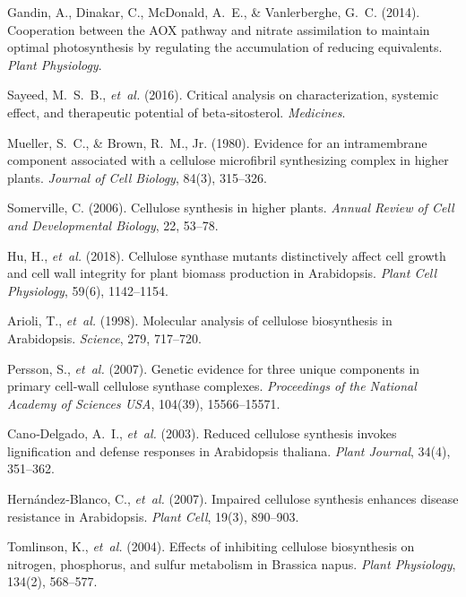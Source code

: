 \documentclass[10pt,letterpaper]{article}
\begin{document}
\begin{thebibliography}{10}
Gandin, A., Dinakar, C., McDonald, A.~E., \& Vanlerberghe, G.~C. (2014).
\newblock Cooperation between the AOX pathway and nitrate assimilation to maintain optimal photosynthesis by regulating the accumulation of reducing equivalents.
\newblock \emph{Plant Physiology}.
  
Sayeed, M.~S.~B., \emph{et~al.} (2016).  
Critical analysis on characterization, systemic effect, and therapeutic potential of beta‑sitosterol.  
\emph{Medicines}.

Mueller, S.~C., \& Brown, R.~M., Jr. (1980).  
Evidence for an intramembrane component associated with a cellulose microfibril synthesizing complex in higher plants.  
\emph{Journal of Cell Biology}, 84(3), 315–326.

Somerville, C. (2006).  
Cellulose synthesis in higher plants.  
\emph{Annual Review of Cell and Developmental Biology}, 22, 53–78.

Hu, H., \emph{et~al.} (2018).  
Cellulose synthase mutants distinctively affect cell growth and cell wall integrity for plant biomass production in Arabidopsis.  
\emph{Plant Cell Physiology}, 59(6), 1142–1154.

Arioli, T., \emph{et~al.} (1998).  
Molecular analysis of cellulose biosynthesis in Arabidopsis.  
\emph{Science}, 279, 717–720.

Persson, S., \emph{et~al.} (2007).  
Genetic evidence for three unique components in primary cell‐wall cellulose synthase complexes.  
\emph{Proceedings of the National Academy of Sciences USA}, 104(39), 15566–15571.

Cano‐Delgado, A.~I., \emph{et~al.} (2003).  
Reduced cellulose synthesis invokes lignification and defense responses in Arabidopsis thaliana.  
\emph{Plant Journal}, 34(4), 351–362.

Hernández‐Blanco, C., \emph{et~al.} (2007).  
Impaired cellulose synthesis enhances disease resistance in Arabidopsis.  
\emph{Plant Cell}, 19(3), 890–903.

Tomlinson, K., \emph{et~al.} (2004).  
Effects of inhibiting cellulose biosynthesis on nitrogen, phosphorus, and sulfur metabolism in Brassica napus.  
\emph{Plant Physiology}, 134(2), 568–577.


\end{thebibliography}
\end{document}
